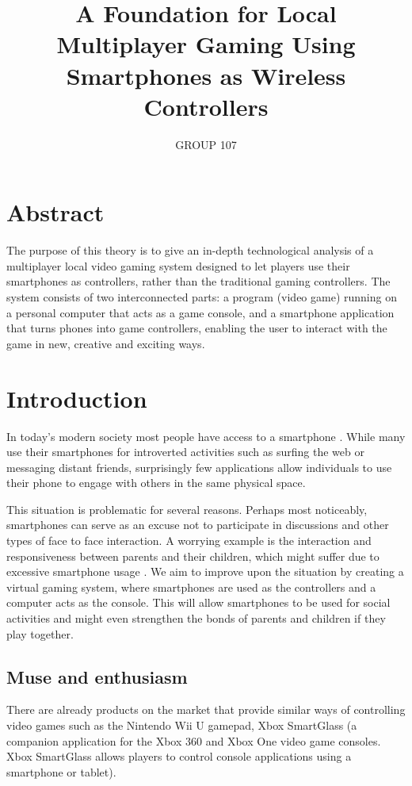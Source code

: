 \documentclass{article}
\title{A Foundation for Local Multiplayer Gaming Using Smartphones as Wireless Controllers}
\author{GROUP 107}
\date{}
\begin{document}
\maketitle
\section{Abstract}
The purpose of this theory is to give an in-depth technological analysis of a multiplayer local video gaming system designed to let players use their smartphones as controllers, rather than the traditional gaming controllers. The system consists of two interconnected parts: a program (video game) running on a personal computer that acts as a game console, and a smartphone application that turns phones into game controllers, enabling the user to interact with the game in new, creative and exciting ways.


\section{Introduction}
In today's modern society most people have access to a smartphone \cite{key:1}. While many use their
smartphones for introverted activities such as surfing the web or messaging distant friends,
surprisingly few applications allow individuals to use their phone to engage with others in the
same physical space.

This situation is problematic for several reasons. Perhaps most noticeably, smartphones can serve
as an excuse not to participate in discussions and other types of face to face interaction. A
worrying example is the interaction and responsiveness between parents and their children,
which might suffer due to excessive smartphone usage \cite{key:2}. We aim to improve upon the situation
by creating a virtual gaming system, where smartphones are used as the controllers and a
computer acts as the console. This will allow smartphones to be used for social activities and
might even strengthen the bonds of parents and children if they play together.


\subsection{Muse and enthusiasm}
There are already products on the market that provide similar ways of controlling video games such as the Nintendo Wii U gamepad, Xbox SmartGlass (a companion application for the Xbox
360 and Xbox One video game consoles. Xbox SmartGlass allows players to control console
applications using a smartphone or tablet).
\end{document}
